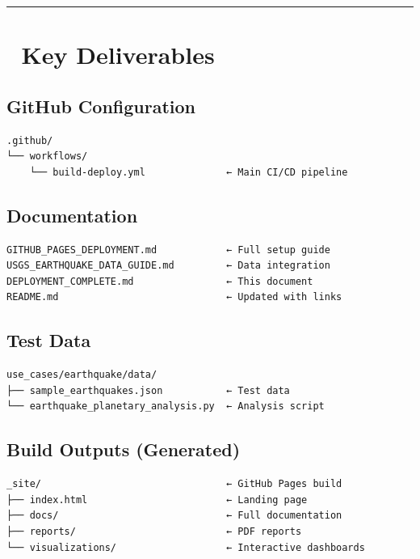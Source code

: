 \documentclass[
  11pt,
  oneside,
  openany]{scrbook}
\begin{document}
\begin{center}\rule{0.5\linewidth}{0.5pt}\end{center}

\chapter{📁 Key Deliverables}\label{key-deliverables}

\section{\texorpdfstring{\textbf{GitHub
Configuration}}{GitHub Configuration}}\label{github-configuration}

\begin{verbatim}
.github/
└── workflows/
    └── build-deploy.yml              ← Main CI/CD pipeline
\end{verbatim}

\section{\texorpdfstring{\textbf{Documentation}}{Documentation}}\label{documentation}

\begin{verbatim}
GITHUB_PAGES_DEPLOYMENT.md            ← Full setup guide
USGS_EARTHQUAKE_DATA_GUIDE.md         ← Data integration
DEPLOYMENT_COMPLETE.md                ← This document
README.md                             ← Updated with links
\end{verbatim}

\section{\texorpdfstring{\textbf{Test
Data}}{Test Data}}\label{test-data}

\begin{verbatim}
use_cases/earthquake/data/
├── sample_earthquakes.json           ← Test data
└── earthquake_planetary_analysis.py  ← Analysis script
\end{verbatim}

\section{\texorpdfstring{\textbf{Build Outputs}
(Generated)}{Build Outputs (Generated)}}\label{build-outputs-generated}

\begin{verbatim}
_site/                                ← GitHub Pages build
├── index.html                        ← Landing page
├── docs/                             ← Full documentation
├── reports/                          ← PDF reports
└── visualizations/                   ← Interactive dashboards
\end{verbatim}
\end{document}
